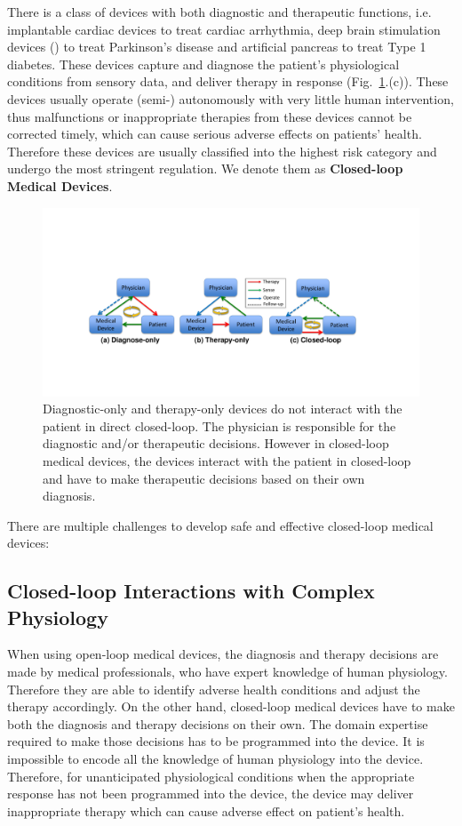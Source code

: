 \documentclass[a4paper]{article}
\newcommand{\figref}[1]{Fig.~\ref{fig:#1}}
\begin{document}
There is a class of devices with both diagnostic and therapeutic functions, i.e. implantable cardiac devices to treat cardiac arrhythmia, deep brain stimulation devices (\cite{Brain_sti}) to treat Parkinson's disease and artificial pancreas to treat Type 1 diabetes. These devices capture and diagnose the patient's physiological conditions from sensory data, and deliver therapy in response (\figref{closed-loop}.(c)). These devices usually operate (semi-) autonomously with very little human intervention, thus malfunctions or inappropriate therapies from these devices cannot be corrected timely, which can cause serious adverse effects on patients' health. Therefore these devices are usually classified into the highest risk category and undergo the most stringent regulation. We denote them as \textbf{Closed-loop Medical Devices}. 
\begin{figure}[t]
		\centering
		\includegraphics[width=\textwidth]{figs/closed-loop.pdf}
		\caption{\small Diagnostic-only and therapy-only devices do not interact with the patient in direct closed-loop. The physician is responsible for the diagnostic and/or therapeutic decisions. However in closed-loop medical devices, the devices interact with the patient in closed-loop and have to make therapeutic decisions based on their own diagnosis.}
		\label{fig:closed-loop}
\end{figure}
There are multiple challenges to develop safe and effective closed-loop medical devices:

\subsection{Closed-loop Interactions with Complex Physiology}
When using open-loop medical devices, the diagnosis and therapy decisions are made by medical professionals, who have expert knowledge of human physiology. Therefore they are able to identify adverse health conditions and adjust the therapy accordingly. On the other hand, closed-loop medical devices have to make both the diagnosis and therapy decisions on their own. The domain expertise required to make those decisions has to be programmed into the device. It is impossible to encode all the knowledge of human physiology into the device. Therefore, for unanticipated physiological conditions when the appropriate response has not been programmed into the device, the device may deliver inappropriate therapy which can cause adverse effect on patient's health. 
\end{document}
